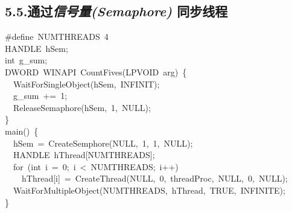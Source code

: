 \documentclass{article}
\begin{document}
\subsection{5.5.\hspace*{0.5em}通过\emph{信号量(Semaphore)} 同步线程}\label{sec--semaphore--}%
\begin{mdpre}%
\noindent\#define~{NUMTHREADS}~{4}\\
{HANDLE}~hSem;\\
{int}~g\_sum;\\
{DWORD}~{WINAPI}~{CountFives}({LPVOID}~arg)~\{\\
~~{WaitForSingleObject}(hSem,~{INFINIT});\\
~~g\_sum~+=~{1};\\
~~{ReleaseSemaphore}(hSem,~{1},~{NULL});\\
\}\\
main()~\{\\
~~hSem~=~{CreateSemphore}({NULL},~{1},~{1},~{NULL});\\
~~{HANDLE}~hThread[{NUMTHREADS}];\\
~~{for}~({int}~i~=~{0};~i~\textless{}~{NUMTHREADS};~i++)\\
~~~~hThread[i]~=~{CreateThread}({NULL},~{0},~threadProc,~{NULL},~{0},~{NULL});\\
~~{WaitForMultipleObject}({NUMTHREADS},~hThread,~{TRUE},~{INFINITE});\\
\}%
\end{mdpre}%
\end{document}
